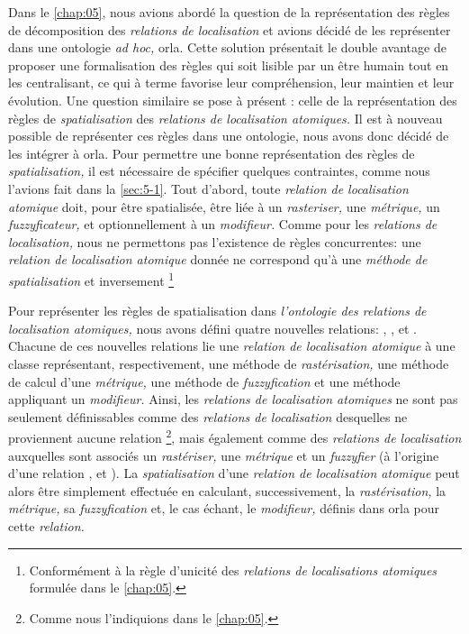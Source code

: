 Dans le \autoref{chap:05}, nous avions abordé la question de la
représentation des règles de décomposition des \emph{relations de
  localisation} et avions décidé de les représenter dans une ontologie
\emph{ad hoc,} \ac{orla}. Cette solution présentait le double avantage
de proposer une formalisation des règles qui soit lisible par un être
humain tout en les centralisant, ce qui à terme favorise leur
compréhension, leur maintien et leur évolution. Une question similaire
se pose à présent : celle de la représentation des règles de
\emph{spatialisation} des \emph{relations de localisation atomiques.}
Il est à nouveau possible de représenter ces règles dans une
ontologie, nous avons donc décidé de les intégrer à \ac{orla}. Pour
permettre une bonne représentation des règles de
\emph{spatialisation,} il est nécessaire de spécifier quelques
contraintes, comme nous l'avions fait dans la \autoref{sec:5-1}. Tout
d'abord, toute \emph{relation de localisation atomique} doit, pour
être spatialisée, être liée à un \emph{rasteriser,} une
\emph{métrique,} un \emph{fuzzyficateur,} et optionnellement à un
\emph{modifieur.} Comme pour les \emph{relations de localisation,}
nous ne permettons pas l’existence de règles concurrentes: une
\emph{relation de localisation atomique} donnée ne correspond qu'à une
\emph{méthode de spatialisation} et inversement \footnote{Conformément
  à la règle d'unicité des \emph{relations de localisations atomiques}
  formulée dans le \autoref{chap:05}.}

Pour représenter les règles de spatialisation dans \emph{l'ontologie
  des relations de localisation atomiques,} nous avons défini quatre
nouvelles relations: ,
,  et
. Chacune de ces nouvelles relations lie
une \emph{relation de localisation atomique} à une classe
représentant, respectivement, une méthode de \emph{rastérisation,} une
méthode de calcul d'une \emph{métrique,} une méthode de
\emph{fuzzyfication} et une méthode appliquant un \emph{modifieur.}
Ainsi, les \emph{relations de localisation atomiques} ne sont pas
seulement définissables comme des \emph{relations de localisation}
desquelles ne proviennent aucune relation
 \footnote{Comme nous
  l'indiquions dans le \autoref{chap:05}.}, mais également comme des
\emph{relations de localisation} auxquelles sont associés un
\emph{rastériser,} une \emph{métrique} et un \emph{fuzzyfier} (\ie à
l'origine d'une relation ,
 et ). La
\emph{spatialisation} d'une \emph{relation de localisation atomique}
peut alors être simplement effectuée en calculant, successivement, la
\emph{rastérisation,} la \emph{métrique,} sa \emph{fuzzyfication} et,
le cas échant, le \emph{modifieur,} définis dans \ac{orla} pour cette
\emph{relation.}


